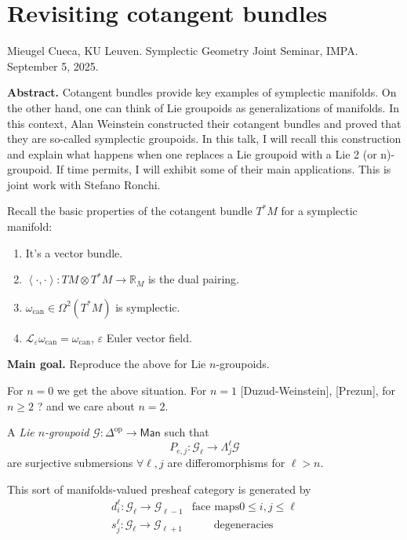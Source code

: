 \section{Revisiting cotangent bundles}
\label{section-revisiting-cotangent-bundles}

\noindent
Mieugel Cueca, KU Leuven.
Symplectic Geometry Joint Seminar, IMPA.
September 5, 2025.

\medskip\noindent
{\bf Abstract.} Cotangent bundles provide key
examples of symplectic
manifolds. On the other hand, one can think
of Lie groupoids as generalizations
of manifolds. In this context, Alan Weinstein
constructed their cotangent
bundles and proved that they are so-called
symplectic groupoids. In this talk, I
will recall this construction and explain
what happens when one replaces a Lie
groupoid with a Lie 2 (or n)-groupoid. If
time permits, I will exhibit some of
their main applications. This is joint work
with Stefano Ronchi.

\medskip\noindent

Recall the basic properties of the cotangent
bundle $T^*M$ for a symplectic manifold:
\begin{enumerate}
\item It's a vector bundle.
\item $\left\langle{}\cdot,\cdot\right\rangle{}:TM \otimes
T^*M \to \mathbb{R}_M$
is the dual pairing.
\item $\omega_{\text{can}}\in \Omega^2(T^*M)$
is symplectic.
\item $\mathcal{L}_\varepsilon
\omega_{\text{can}}=\omega_{\text{can}}$,
$\varepsilon$ Euler vector field.
\end{enumerate}

\medskip\noindent
{\bf Main goal.} Reproduce the above for Lie
$n$-groupoids.

For $n=0$ we get the above situation. For
$n=1$ [Duzud-Weinstein], [Prezun],
for $n\geq 2$ ? and we care about $n=2$.

\begin{definition}
\label{definition-groupoid}
A {\it Lie $n$-groupoid}
$\mathcal{G}:\Delta^{\text{op}}\to
\mathsf{Man}$
such that
$$
P_{e,j}:\mathcal{G}_{\ell}\to \Lambda_j^\ell
\mathcal{G}
$$
are surjective submersions $\forall  \ell,j$
are differomorphisms for $\ell > n$.
\end{definition}

\begin{remark}
\label{remark-generators}
This sort of manifolds-valued presheaf
category is generated by
$$
\begin{aligned}
d_i^\ell:\mathcal{G}_\ell \to
\mathcal{G}_{\ell-1}&\text{face maps}
0 \leq  i,j \leq  \ell\\
s_j^\ell:\mathcal{G}_\ell \to
\mathcal{G}_{\ell+1}&  \qquad
\text{degeneracies}
\end{aligned}
$$
\end{remark}

